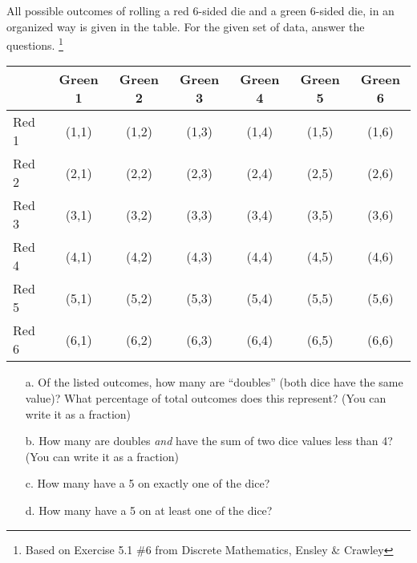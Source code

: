     \begin{questionNOGRADE}{\thequestion}

        All possible outcomes of rolling a red 6-sided die and a green 6-sided die,
        in an organized way is given in the table. For the given set of data, answer the questions.
        \footnote{Based on Exercise 5.1 \#6 from Discrete Mathematics, Ensley \& Crawley}
        ~\\

        \begin{tabular}{ l | c c c c c c }
            & Green 1 & Green 2 & Green 3 & Green 4 & Green 5 & Green 6 \\ \hline
            Red 1 & (1,1) & (1,2) & (1,3) & (1,4) & (1,5) & (1,6) \\
            Red 2 & (2,1) & (2,2) & (2,3) & (2,4) & (2,5) & (2,6) \\
            Red 3 & (3,1) & (3,2) & (3,3) & (3,4) & (3,5) & (3,6) \\
            Red 4 & (4,1) & (4,2) & (4,3) & (4,4) & (4,5) & (4,6) \\
            Red 5 & (5,1) & (5,2) & (5,3) & (5,4) & (5,5) & (5,6) \\
            Red 6 & (6,1) & (6,2) & (6,3) & (6,4) & (6,5) & (6,6) \\
            
        \end{tabular}

        \begin{enumerate}
            \item[a.]   Of the listed outcomes, how many are ``doubles''
                        (both dice have the same value)? What percentage of
                        total outcomes does this represent?
                        (You can write it as a fraction)

            \item[b.]   How many are doubles \textit{and} have the sum
                        of two dice values less than 4?
                        (You can write it as a fraction)

            \item[c.]   How many have a 5 on exactly one of the dice?

            \item[d.]   How many have a 5 on at least one of the dice?
        \end{enumerate}
        
    \end{questionNOGRADE}

